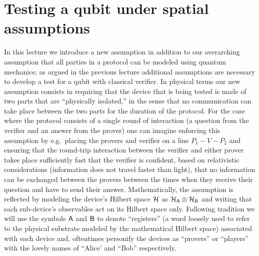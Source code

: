 \chapter{Testing a qubit under spatial assumptions}


In this lecture we introduce a new assumption in addition to our overarching assumption that all parties in a protocol can be modeled using quantum mechanics; as argued in the previous lecture additional assumptions are necessary to develop a test for a qubit with classical verifier. In physical terms our new assumption consists in requiring that the device that is being tested is made of two parts that are ``physically isolated,'' in the sense that no communication can take place between the two parts for the duration of the protocol. For the case where the protocol consists of a single round of interaction (a question from the verifier and an answer from the prover) one can imagine enforcing this assumption by e.g.\ placing the provers and verifier on a line $P_1-V-P_2$ and ensuring that the round-trip interaction between the verifier and either prover takes place sufficiently fast that the verifier is confident, based on relativistic considerations (information does not travel faster than light), that no information can be exchanged between the provers between the times when they receive their question and have to send their answer. Mathematically, the assumption is reflected by modeling the device's Hilbert space $\mathcal{H}$ as $\mathcal{H}_{\textsf{A}} \otimes \mathcal{H}_{\textsf{B}}$ and writing that each sub-device's observables act on its Hilbert space only. Following tradition we will use the symbols ${\textsf{A}}$ and ${\textsf{B}}$ to denote ``registers'' (a word loosely used to refer to the physical substrate modeled by the mathematical Hilbert space) associated with each device and, oftentimes personify the devices as ``provers'' or ``players'' with the lovely names of  ``Alice' and ``Bob'' respectively. 

